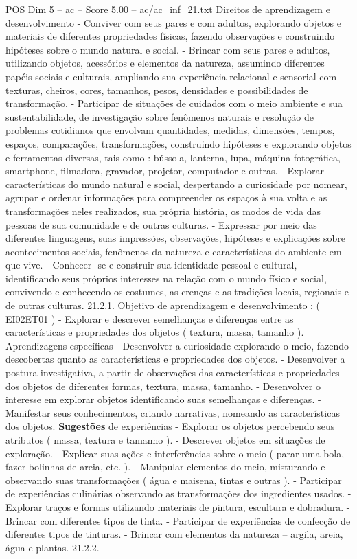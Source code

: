 \begin{textsample}{POS Dim 5 – ac – Score 5.00 – ac/ac\_inf\_21.txt}
Direitos de aprendizagem e desenvolvimento - Conviver com seus pares e com adultos, explorando objetos e materiais de diferentes propriedades físicas, fazendo observações e construindo hipóteses sobre o mundo natural e social. - Brincar com seus pares e adultos, utilizando objetos, acessórios e elementos da natureza, assumindo diferentes papéis sociais e culturais, ampliando sua experiência relacional e sensorial com texturas, cheiros, cores, tamanhos, pesos, densidades e possibilidades de transformação. - Participar de situações de cuidados com o meio ambiente e sua sustentabilidade, de investigação sobre fenômenos naturais e resolução de problemas cotidianos que envolvam quantidades, medidas, dimensões, tempos, espaços, comparações, transformações, construindo hipóteses e explorando objetos e ferramentas diversas, tais como : bússola, lanterna, lupa, máquina fotográfica, smartphone, filmadora, gravador, projetor, computador e outras. - Explorar características do mundo natural e social, despertando a curiosidade por nomear, agrupar e ordenar informações para compreender os espaços à sua volta e as transformações neles realizados, sua própria história, os modos de vida das pessoas de sua comunidade e de outras culturas. - Expressar por meio das diferentes linguagens, suas impressões, observações, hipóteses e explicações sobre acontecimentos sociais, fenômenos da natureza e características do ambiente em que vive. - Conhecer -se e construir sua identidade pessoal e cultural, identificando seus próprios interesses na relação com o mundo físico e social, convivendo e conhecendo os costumes, as crenças e as tradições locais, regionais e de outras culturas. 21.2.1.
Objetivo de aprendizagem e desenvolvimento : ( EI02ET01 ) - Explorar e descrever semelhanças e diferenças entre as características e propriedades dos objetos ( textura, massa, tamanho ).
Aprendizagens específicas - Desenvolver a curiosidade explorando o meio, fazendo descobertas quanto as características e propriedades dos objetos. - Desenvolver a postura investigativa, a partir de observações das características e propriedades dos objetos de diferentes formas, textura, massa, tamanho. - Desenvolver o interesse em explorar objetos identificando suas semelhanças e diferenças. - Manifestar seus conhecimentos, criando narrativas, nomeando as características dos objetos. \textbf{Sugestões} de experiências - Explorar os objetos percebendo seus atributos ( massa, textura e tamanho ). - Descrever objetos em situações de exploração. - Explicar suas ações e interferências sobre o meio ( parar uma bola, fazer bolinhas de areia, etc. ). - Manipular elementos do meio, misturando e observando suas transformações ( água e maisena, tintas e outras ). - Participar de experiências culinárias observando as transformações dos ingredientes usados. - Explorar traços e formas utilizando materiais de pintura, escultura e dobradura. - Brincar com diferentes tipos de tinta. - Participar de experiências de confecção de diferentes tipos de tinturas. - Brincar com elementos da natureza – argila, areia, água e plantas. 21.2.2.

\end{textsample}
